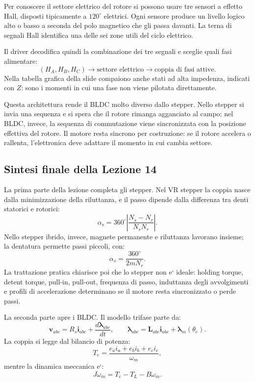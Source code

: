 \documentclass[11pt,a4paper]{article}
\begin{document}
Per conoscere il settore elettrico del rotore si possono usare tre sensori a effetto Hall, disposti tipicamente a \(120^\circ\) elettrici. Ogni sensore produce un livello logico alto o basso a seconda del polo magnetico che gli passa davanti. La terna di segnali Hall identifica una delle sei zone utili del ciclo elettrico.

Il driver decodifica quindi la combinazione dei tre segnali e sceglie quali fasi alimentare:
\[
(H_A,H_B,H_C)
\longrightarrow
\text{settore elettrico}
\longrightarrow
\text{coppia di fasi attive}.
\]
Nella tabella grafica della slide compaiono anche stati ad alta impedenza, indicati con \(Z\): sono i momenti in cui una fase non viene pilotata direttamente.

Questa architettura rende il BLDC molto diverso dallo stepper. Nello stepper si invia una sequenza e si spera che il rotore rimanga agganciato al campo; nel BLDC, invece, la sequenza di commutazione viene sincronizzata con la posizione effettiva del rotore. Il motore resta sincrono per costruzione: se il rotore accelera o rallenta, l'elettronica deve adattare il momento in cui cambia settore.

\subsection*{Sintesi finale della Lezione 14}

La prima parte della lezione completa gli stepper. Nel VR stepper la coppia nasce dalla minimizzazione della riluttanza, e il passo dipende dalla differenza tra denti statorici e rotorici:
\[
\alpha_s
=360^\circ
\left|
\frac{N_s-N_r}{N_sN_r}
\right|.
\]
Nello stepper ibrido, invece, magnete permanente e riluttanza lavorano insieme; la dentatura permette passi piccoli, con:
\[
\alpha_s=\frac{360^\circ}{2mN_r}.
\]
La trattazione pratica chiarisce poi che lo stepper non e` ideale: holding torque, detent torque, pull-in, pull-out, frequenza di passo, induttanza degli avvolgimenti e profili di accelerazione determinano se il motore resta sincronizzato o perde passi.

La seconda parte apre i BLDC. Il modello trifase parte da:
\[
\mathbf v_{abc}
=R_s\mathbf i_{abc}
+\frac{d\boldsymbol\lambda_{abc}}{dt},
\qquad
\boldsymbol\lambda_{abc}
=\mathbf L_{abc}\mathbf i_{abc}
+\boldsymbol\lambda_m(\theta_e).
\]
La coppia si legge dal bilancio di potenza:
\[
T_e=
\frac{e_a i_a+e_b i_b+e_c i_c}{\omega_m},
\]
mentre la dinamica meccanica e`:
\[
J\dot\omega_m=T_e-T_L-B\omega_m.
\]
\end{document}
